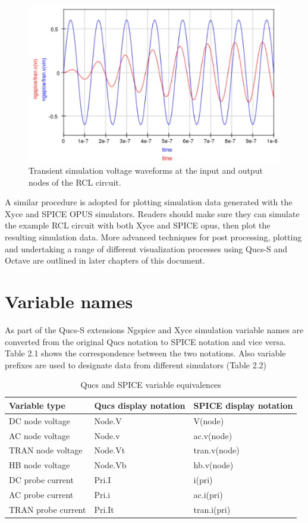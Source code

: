 \documentclass[10pt, a4paper]{report}
\begin{document}
 \begin{figure}[h]
	\centering
	\includegraphics[width=12cm]{pics/chap2/RCL_tran.pdf}
	\caption{ Transient simulation voltage waveforms at the input and output nodes of the RCL circuit.  }
	\label{Fig15}
\end{figure}
A similar procedure is adopted for plotting simulation data generated with the Xyce and SPICE OPUS simulators.  Readers should make sure they can simulate the example RCL circuit with both Xyce and SPICE opus, then plot the resulting simulation data.  More advanced techniques for post processing, plotting and undertaking a range of different visualization processes using Qucs-S and Octave are outlined in later chapters of this document.

\section{Variable names}
As part of the Qucs-S extensions Ngspice and Xyce simulation variable names are converted from the original Qucs 
notation to SPICE notation and vice versa. Table 2.1 shows the correspondence between the two notations. Also variable prefixes are used to designate data from different simulators (Table 2.2)

\begin{table} [h]
	\centering	
	\caption{Qucs and SPICE  variable equivalences}
	\label{Table1}
	\begin{tabular}  {|l|l|l|} \hline			
		\textbf{Variable type}&\textbf{Qucs display notation}&  \textbf{SPICE display notation} \\  
		\hline   
		DC node voltage   &    Node.V    &       V(node) \\
		AC node voltage   &    Node.v    &       ac.v(node)\\
		TRAN node voltage &    Node.Vt   &       tran.v(node)\\
		HB node voltage   &    Node.Vb   &       hb.v(node) \\
		DC probe current  &    Pri.I     &       i(pri)  \\
		AC probe current  &    Pri.i     &       ac.i(pri)\\
		TRAN probe current &   Pri.It    &       tran.i(pri)\\	
		\hline
	\end{tabular}
\end{table}
\end{document}
